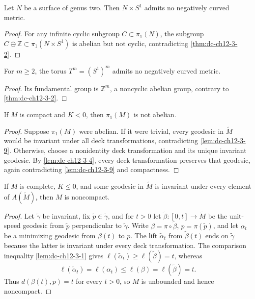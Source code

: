 \begin{example}
  \label{ex:dc-ch12-3-6}
  Let $N$ be a surface of genus two. Then $N\times S^1$ admits no negatively
  curved metric.
\end{example}
\begin{proof}

  \sketch
  For any infinite cyclic subgroup $C\subset\pi_1(N)$, the subgroup
  $C\oplus\mathbb Z\subset\pi_1(N\times S^1)$ is abelian but not cyclic,
  contradicting \cref{thm:dc-ch12-3-2}.
\end{proof}

\begin{example}
  \label{ex:dc-ch12-3-7}
  For $m\geq2$, the torus $T^m=(S^1)^m$ admits no negatively curved metric.
\end{example}
\begin{proof}

  \sketch
  Its fundamental group is $\mathbb Z^m$, a noncyclic abelian group, contrary
  to \cref{thm:dc-ch12-3-2}.
\end{proof}

\begin{theorem}
  \label{thm:dc-ch12-3-8}
  If $M$ is compact and $K<0$, then $\pi_1(M)$ is not abelian.
\end{theorem}
\begin{proof}
  \sketch
  Suppose $\pi_1(M)$ were abelian. If it were trivial, every geodesic in
  $\tilde M$ would be invariant under all deck transformations, contradicting
  \cref{lem:dc-ch12-3-9}. Otherwise, choose a nonidentity deck transformation
  and its unique invariant geodesic. By \cref{lem:dc-ch12-3-4}, every deck
  transformation preserves that geodesic, again contradicting
  \cref{lem:dc-ch12-3-9} and compactness.
\end{proof}

\begin{lemma}
  \label{lem:dc-ch12-3-9}
  If $M$ is complete, $K\leq0$, and some geodesic in $\tilde M$ is invariant
  under every element of $A(\tilde M)$, then $M$ is noncompact.
\end{lemma}
\begin{proof}
  \sketch
  Let $\tilde\gamma$ be invariant, fix $\tilde p\in\tilde\gamma$, and for
  $t>0$ let $\tilde\beta:[0,t]\to\tilde M$ be the unit-speed geodesic from
  $\tilde p$ perpendicular to $\tilde\gamma$. Write
  $\beta=\pi\circ\tilde\beta$, $p=\pi(\tilde p)$, and let $\alpha_t$ be a
  minimizing geodesic from $\beta(t)$ to $p$. The lift $\tilde\alpha_t$ from
  $\tilde\beta(t)$ ends on $\tilde\gamma$ because the latter is invariant under
  every deck transformation. The comparison inequality
  \cref{lem:dc-ch12-3-1} gives
  $\ell(\tilde\alpha_t)\geq\ell(\tilde\beta)=t$, whereas
  \[
    \ell(\tilde\alpha_t)=\ell(\alpha_t)
    \leq\ell(\beta)=\ell(\tilde\beta)=t.
  \]
  Thus $d(\beta(t),p)=t$ for every $t>0$, so $M$ is unbounded and hence
  noncompact.
\end{proof}

